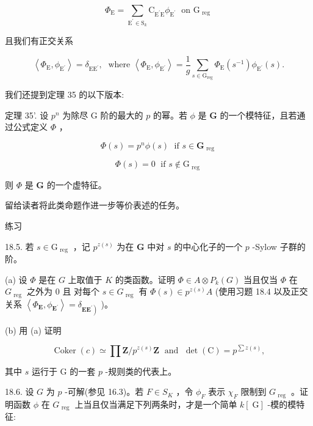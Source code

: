 \documentclass[10pt]{article}
\begin{document}
\[
{\Phi }_{\mathrm{E}} = \mathop{\sum }\limits_{{{\mathrm{E}}^{\prime } \in  {\mathrm{S}}_{k}}}{\mathrm{C}}_{{\mathrm{E}}^{\prime }\mathrm{E}}{\phi }_{{\mathrm{E}}^{\prime }}\;\text{ on }{\mathrm{G}}_{\text{ reg }}
\]

且我们有正交关系

\[
\left\langle  {{\Phi }_{\mathrm{E}},{\phi }_{{\mathrm{E}}^{\prime }}}\right\rangle   = {\delta }_{{\mathrm{{EE}}}^{\prime }},\;\text{ where }\left\langle  {{\Phi }_{\mathrm{E}},{\phi }_{{\mathrm{E}}^{\prime }}}\right\rangle   = \frac{1}{g}\mathop{\sum }\limits_{{s \in  {\mathrm{G}}_{\mathrm{{reg}}}}}{\Phi }_{\mathrm{E}}\left( {s}^{-1}\right) {\phi }_{{\mathrm{E}}^{\prime }}\left( s\right) .
\]

我们还提到定理 35 的以下版本:

定理 35’. 设 \({p}^{n}\) 为除尽 G 阶的最大的 \(p\) 的幂。若 \(\phi\) 是 \(\mathbf{G}\) 的一个模特征，且若通过公式定义 \(\Phi\) ，

\[
\Phi \left( s\right)  = {p}^{n}\phi \left( s\right) \;\text{ if }s \in  {\mathbf{G}}_{\text{ reg }}
\]

\[
\Phi \left( s\right)  = 0\;\text{ if }s \notin  {\mathrm{G}}_{\text{ reg }}
\]

则 \(\Phi\) 是 \(\mathbf{G}\) 的一个虚特征。

留给读者将此类命题作进一步等价表述的任务。

练习

18.5. 若 \(s \in  {\mathrm{G}}_{\text{ reg }}\) ，记 \({p}^{z\left( s\right) }\) 为在 \(\mathbf{G}\) 中对 \(s\) 的中心化子的一个 \(p\) -Sylow 子群的阶。

(a) 设 \(\Phi\) 是在 \(G\) 上取值于 \(K\) 的类函数。证明 \(\Phi  \in  A \otimes  {P}_{k}\left( G\right)\) 当且仅当 \(\Phi\) 在 \({G}_{\text{ reg }}\) 之外为 0 且 对每个 \(s \in  {G}_{\text{ reg }}\) 有 \(\Phi \left( s\right)  \in  {p}^{z\left( s\right) }A\) (使用习题 18.4 以及正交关系 \(\left\langle  {{\Phi }_{\mathbf{E}},{\phi }_{{\mathbf{E}}^{\prime }}}\right\rangle   = {\delta }_{\left. \mathbf{E}{\mathbf{E}}^{\prime }\right) }\) )。

(b) 用 (a) 证明

\[
\operatorname{Coker}\left( c\right)  \simeq  \prod \mathbf{Z}/{p}^{z\left( s\right) }\mathbf{Z}\;\text{ and }\;\det \left( \mathrm{C}\right)  = {p}^{\sum z\left( s\right) },
\]

其中 \(s\) 运行于 G 的一套 \(p\) -规则类的代表上。

18.6. 设 \(G\) 为 \(p\) -可解(参见 16.3)。若 \(F \in  {S}_{K}\) ，令 \({\phi }_{F}\) 表示 \({\chi }_{F}\) 限制到 \({G}_{\text{ reg }}\) 。证明函数 \(\phi\) 在 \({G}_{\text{ reg }}\) 上当且仅当满足下列两条时，才是一个简单 \(k\left\lbrack  \mathrm{\;G}\right\rbrack\) -模的模特征:
\end{document}
